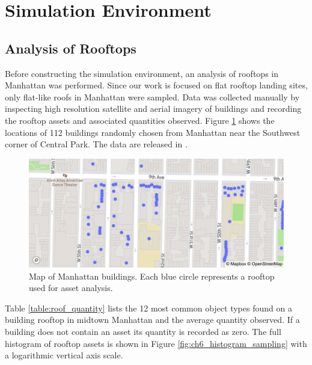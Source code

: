 \section{Simulation Environment}\label{sec:ch6_simulation_environment}

\subsection{Analysis of Rooftops}\label{sec:ch6_rooftop_analysis}

Before constructing the simulation environment, an analysis of rooftops in Manhattan was performed. Since our work is focused on flat rooftop landing sites, only flat-like roofs in Manhattan were sampled. Data was collected manually by inspecting high resolution satellite and aerial imagery of buildings and recording the rooftop assets and associated quantities observed. Figure \ref{fig:ch6_ny_rooftops} shows the locations of 112 buildings randomly chosen from Manhattan near the Southwest corner of Central Park. The  data are released in  \cite{Castagno_Github_UnrealLanding}.

\begin{figure}[ht!]
\centering
\includegraphics[angle=0,origin=c,width=.75\columnwidth]{chapter_6_landingsim/figs/map_ny_vector.pdf}
\caption[Map of Manhattan buildings observed for rooftop assets]{Map of Manhattan buildings. Each blue circle represents a rooftop  used for asset analysis.}
\label{fig:ch6_ny_rooftops}
\end{figure}

Table \ref{table:roof_quantity} lists the 12 most common object types found on a building rooftop in midtown Manhattan and the average quantity observed. If a building does not contain an asset its quantity is recorded as zero.  The full histogram of rooftop assets is shown in Figure \ref{fig:ch6_histogram_sampling} with a logarithmic vertical axis scale.

